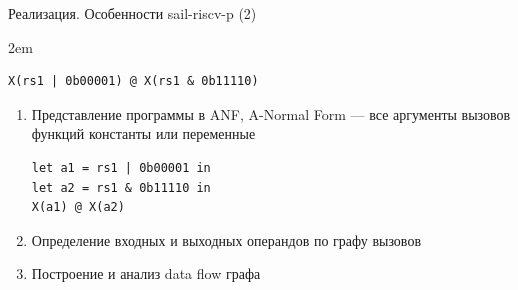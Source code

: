 \documentclass
  [ russian
  , aspectratio=169 %
  ] {beamer}
\begin{document}
\begin{frame}[fragile]{Реализация. Особенности sail-riscv-p (2)}


    \begin{adjustwidth}{2em}{}
        \begin{lstlisting}[caption={}, language=sail, frame=single]
X(rs1 | 0b00001) @ X(rs1 & 0b11110)
\end{lstlisting}
    \end{adjustwidth}

    \begin{enumerate}
        \item Представление программы в ANF, A-Normal Form --- все аргументы вызовов функций константы или переменные
              \begin{lstlisting}[caption={}, language=sail, frame=single]
let a1 = rs1 | 0b00001 in
let a2 = rs1 & 0b11110 in
X(a1) @ X(a2)
\end{lstlisting}
        \item Определение входных и выходных операндов по графу вызовов
        \item Построение и анализ data flow графа

              \begin{center}
              \end{center}

    \end{enumerate}

\end{frame}
\end{document}
